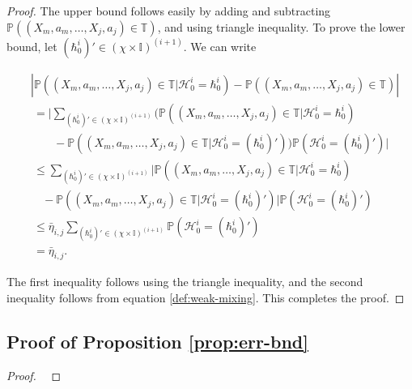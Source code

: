 \documentclass[opre,sglanonrev]{informs4}
\numberwithin{equation}{section}
\newcommand{\lv}{\left|}
\newcommand{\rv}{\right|}
\newcommand{\History}{\mathcal{H}}
\newcommand{\history}{\hbar}
\newcommand{\Ibb}{\mathbb{I}}
\newcommand{\Pbb}{\mathbb{P}}
\newcommand{\prob}{\Pbb}
\begin{document}
\begin{APPENDICES}
\begin{proof}
The upper bound follows easily by adding and subtracting $\prob\left((X_m,a_m,\dots, X_j,a_j)\in \mathbb{T}\right)$, and using triangle inequality. To prove the lower bound, let $(\history_0^i)'\in(\chi\times\Ibb)^{(i+1)}$. We can write
\begin{small}
\begin{align*}
    &\lv\prob\left((X_m,a_m,\dots, X_j,a_j)\in \mathbb{T}|\History_0^{i}=\history_0^{i}\right)-\prob\left((X_m,a_m,\dots, X_j,a_j)\in \mathbb{T}\right)\rv\\
    & \ = \Bigg |\sum_{(\history_0^i)'\in(\chi\times\Ibb)^{(i+1)}} (\prob\left((X_m,a_m,\dots, X_j,a_j)\in \mathbb{T}|\History_0^{i}=\history_0^{i}\right)\\ 
    &\quad \quad -\prob\left((X_m,a_m,\dots, X_j,a_j)\in \mathbb{T}|\History_0^i=(\history_0^i)'\right))\prob(\History_0^i=(\history_0^i)') \Bigg |\\
    & \ \leq \sum_{(\history_0^i)'\in(\chi\times\Ibb)^{(i+1)}}\Bigg |  \prob\left((X_m,a_m,\dots, X_j,a_j)\in \mathbb{T}|\History_0^{i}=\history_0^{i}\right)\\ 
    & \quad -\prob\left((X_m,a_m,\dots, X_j,a_j)\in \mathbb{T}|\History_0^i=(\history_0^i)'\right)\Bigg |\prob(\History_0^i=(\history_0^i)')\\
    & \ \leq \bar\eta_{i,j}\sum_{(\history_0^i)'\in(\chi\times\Ibb)^{(i+1)}}\prob(\History_0^i=(\history_0^i)')\\
    & \ =\bar\eta_{i,j}.
\end{align*}
\end{small}
The first inequality follows using the triangle inequality, and the second inequality follows from equation \ref{def:weak-mixing}. This completes the proof.

\end{proof}

\subsection{Proof of Proposition \ref{prop:err-bnd}}
\begin{proof} \ 


\end{proof}
\end{APPENDICES}
\end{document}
